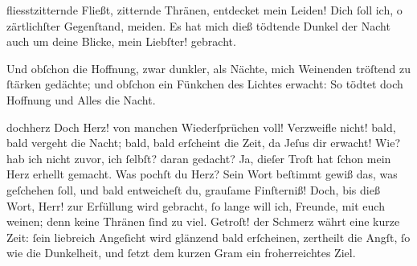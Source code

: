 \documentclass{ees}
\begin{document}
{  \begin{movement}{fliesstzitternde}
    \voice[Johannes]
    Fließt, zitternde Thränen, entdecket mein Leiden!
    Dich ſoll ich, o zärtlichſter Gegenſtand, meiden.
    Es hat mich dieß tödtende Dunkel der Nacht
    auch um deine Blicke, mein Liebſter! gebracht.

    Und obſchon die Hoffnung, zwar dunkler, als Nächte,
    mich Weinenden tröſtend zu ſtärken gedächte;
    und obſchon ein Fünkchen des Lichtes erwacht:
    So tödtet doch Hoffnung und Alles die Nacht.
  \end{movement}

  \begin{movement}{dochherz}
    \voice[Johannes]
    Doch Herz! von manchen Wiederſprüchen voll!
    Verzweifle nicht! bald, bald vergeht die Nacht;
    bald, bald erſcheint die Zeit, da Jeſus dir erwacht!
    Wie? hab ich nicht zuvor, ich ſelbſt? daran gedacht?
    Ja, dieſer Troſt hat ſchon mein Herz erhellt gemacht.
    Was pochſt du Herz? Sein Wort beſtimmt gewiß
    das, was geſchehen ſoll,
    und bald entweicheſt du, grauſame Finſterniß!
    Doch, bis dieß Wort, Herr! zur Erfüllung wird gebracht,
    ſo lange will ich, Freunde, mit euch weinen;
    denn keine Thränen ſind zu viel.
    Getroſt! der Schmerz währt eine kurze Zeit:
    ſein liebreich Angeſicht wird glänzend bald erſcheinen,
    zertheilt die Angſt, ſo wie die Dunkelheit,
    und ſetzt dem kurzen Gram ein froherreichtes Ziel.
  \end{movement}








}

\eesScore
\end{document}
